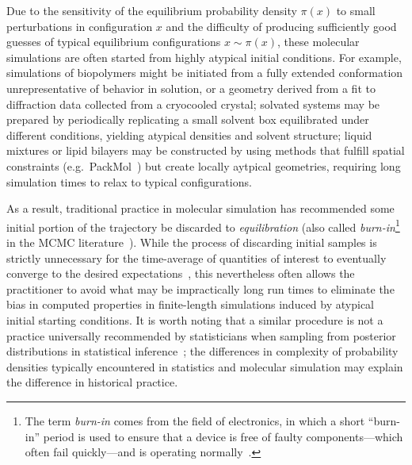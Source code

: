 \documentclass[aps,pre,twocolumn,nofootinbib,superscriptaddress,linenumbers,11point]{revtex4-1}
\begin{document}
Due to the sensitivity of the equilibrium probability density $\pi(x)$ to small perturbations in configuration $x$ and the difficulty of producing sufficiently good guesses of typical equilibrium configurations $x \sim \pi(x)$, these molecular simulations are often started from highly atypical initial conditions.
For example, simulations of biopolymers might be initiated from a fully extended conformation unrepresentative of behavior in solution, or a geometry derived from a fit to diffraction data collected from a cryocooled crystal; 
solvated systems may be prepared by periodically replicating a small solvent box equilibrated under different conditions, yielding atypical densities and solvent structure; 
liquid mixtures or lipid bilayers may be constructed by using methods that fulfill spatial constraints (e.g.~PackMol~\cite{martinez:jctc:2009:packmol}) but create locally aytpical geometries, requiring long simulation times to relax to typical configurations.

As a result, traditional practice in molecular simulation has recommended some initial portion of the trajectory be discarded to \emph{equilibration} (also called \emph{burn-in}\footnote{The term \emph{burn-in} comes from the field of electronics, in which a short ``burn-in'' period is used to ensure that a device is free of faulty components---which often fail quickly---and is operating normally~\cite{crc-mcmc-handbook}.} in the MCMC literature~\cite{crc-mcmc-handbook}).
While the process of discarding initial samples is strictly unnecessary for the time-average of quantities of interest to eventually converge to the desired expectations~\cite{geyer:burn-in-unnecessary}, this nevertheless often allows the practitioner to avoid what may be impractically long run times to eliminate the bias in computed properties in finite-length simulations induced by atypical initial starting conditions.
It is worth noting that a similar procedure is not a practice universally recommended by statisticians when sampling from posterior distributions in statistical inference~\cite{crc-mcmc-handbook}; the differences in complexity of probability densities typically encountered in statistics and molecular simulation may explain the difference in historical practice.
\end{document}
